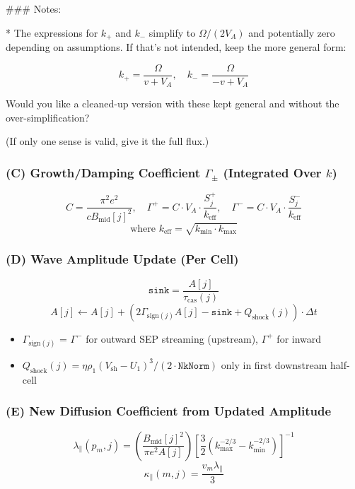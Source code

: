 ### Notes:

* The expressions for $k_+$ and $k_-$ simplify to $\Omega / (2V_A)$ and potentially zero depending on assumptions. If that's not intended, keep the more general form:

$$
k_+ = \frac{\Omega}{v + V_A}, \quad k_- = \frac{\Omega}{-v + V_A}
$$

Would you like a cleaned-up version with these kept general and without the over-simplification?


(If only one sense is valid, give it the full flux.)

\subsubsection*{(C) Growth/Damping Coefficient $\Gamma_\pm$ (Integrated Over $k$)}

\[
C = \frac{\pi^2 e^2}{c B_{\text{mid}}[j]^2}, \quad
\Gamma^+ = C \cdot V_A \cdot \frac{S^+_j}{k_{\text{eff}}}, \quad
\Gamma^- = C \cdot V_A \cdot \frac{S^-_j}{k_{\text{eff}}}
\]
\[
\text{where } k_{\text{eff}} = \sqrt{k_{\text{min}} \cdot k_{\text{max}}}
\]

\subsubsection*{(D) Wave Amplitude Update (Per Cell)}

\[
\texttt{sink} = \frac{A[j]}{\tau_{\text{cas}}(j)}
\]
\[
A[j] \leftarrow A[j] + \left( 2 \Gamma_{\text{sign}(j)} A[j] - \texttt{sink} + Q_{\text{shock}}(j) \right) \cdot \Delta t
\]

\begin{itemize}
\item $\Gamma_{\text{sign}(j)}$ = $\Gamma^-$ for outward SEP streaming (upstream), $\Gamma^+$ for inward
\item $Q_{\text{shock}}(j) = \eta \rho_1 (V_{\text{sh}} - U_1)^3 / (2 \cdot \texttt{NkNorm})$ only in first downstream half-cell
\end{itemize}

\subsubsection*{(E) New Diffusion Coefficient from Updated Amplitude}

\[
\lambda_\parallel(p_m, j) = \left( \frac{B_{\text{mid}}[j]^2}{\pi e^2 A[j]} \right) \left[ \frac{3}{2}(k_{\text{max}}^{-2/3} - k_{\text{min}}^{-2/3}) \right]^{-1}
\]
\[
\kappa_\parallel(m,j) = \frac{v_m \lambda_\parallel}{3}
\]

